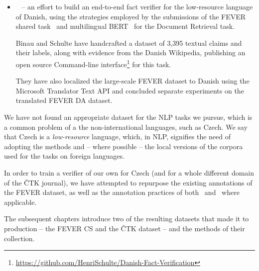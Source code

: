 \begin{itemize}
    It was collected using a \textsf{Flask} app called the \textsf{FEVER Annotations Platform}, which has been partly open-sourced\footnote{\url{https://github.com/awslabs/fever}} and thoroughly described in~\cite{fever}.
    \item {}~\cite{danish} -- an effort to build an end-to-end fact verifier for the low-resource language of Danish, using the strategies employed by the submissions of the \textsf{FEVER} shared task~\cite{fever1} and \textsf{multilingual BERT}~\cite{devlin2019bert} for the Document Retrieval task.
    
    Binau and Schulte have handcrafted a dataset of 3,395 textual claims and their labels, along with evidence from the Danish \textsf{Wikipedia}, publishing an open source Command-line interface\footnote{\url{https://github.com/HenriSchulte/Danish-Fact-Verification}} for this task.
    
    They have also localized the large-scale \textsf{FEVER} dataset to Danish using the \textsf{Microsoft Translator Text API} and concluded separate experiments on the translated \textsf{FEVER DA} dataset.
\end{itemize}
We have not found an appropriate dataset for the NLP tasks we pursue, which is a common problem of a the non-international languages, such as Czech. We say that Czech is a \textit{low-resource} language, which, in NLP, signifies the need of adopting the methods and -- where possible -- the local versions of the corpora used for the tasks on foreign languages.

In order to train a verifier of our own for Czech (and for a whole different domain of the \textsf{ČTK} journal), we have attempted to repurpose the existing annotations of the \textsf{FEVER} dataset, as well as the annotation practices of both~\cite{fever} and~\cite{danish} where applicable.

The subsequent chapters introduce two of the resulting datasets that made it to production -- the {\techbf FEVER CS} and the {\techbf ČTK} dataset -- and the methods of their collection.

